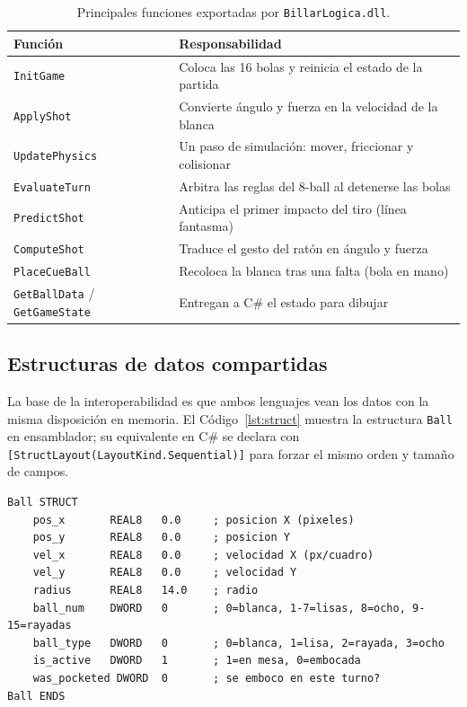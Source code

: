\documentclass[a4paper,12pt]{article}
\begin{document}
\begin{table}[H]
\centering
\caption{Principales funciones exportadas por \texttt{BillarLogica.dll}.}
\label{tab:exportadas}
\small
\renewcommand{\arraystretch}{1.25}
\begin{tabular}{
    >{\raggedright\arraybackslash}p{4.2cm}
    >{\raggedright\arraybackslash}p{9.0cm}
}
\toprule
\rowcolor{VerdeUABC}
\color{white}\textbf{Función} &
\color{white}\textbf{Responsabilidad} \\
\midrule
\rowcolor{rowLight}
\texttt{InitGame} & Coloca las 16 bolas y reinicia el estado de la partida \\
\texttt{ApplyShot} & Convierte ángulo y fuerza en la velocidad de la blanca \\
\rowcolor{rowLight}
\texttt{UpdatePhysics} & Un paso de simulación: mover, friccionar y colisionar \\
\texttt{EvaluateTurn} & Arbitra las reglas del 8-ball al detenerse las bolas \\
\rowcolor{rowLight}
\texttt{PredictShot} & Anticipa el primer impacto del tiro (línea fantasma) \\
\texttt{ComputeShot} & Traduce el gesto del ratón en ángulo y fuerza \\
\rowcolor{rowLight}
\texttt{PlaceCueBall} & Recoloca la blanca tras una falta (bola en mano) \\
\texttt{GetBallData} / \texttt{GetGameState} & Entregan a C\# el estado para dibujar \\
\bottomrule
\end{tabular}
\end{table}

\subsection{Estructuras de datos compartidas}
La base de la interoperabilidad es que ambos lenguajes vean los datos con la misma disposición en memoria. El Código~\ref{lst:struct} muestra la estructura \texttt{Ball} en ensamblador; su equivalente en C\# se declara con \texttt{[StructLayout(LayoutKind.Sequential)]} para forzar el mismo orden y tamaño de campos.

\begin{lstlisting}[style=assemblyStyle, caption={Estructura \texttt{Ball} en ensamblador (campos REAL8 y DWORD).}, label={lst:struct}]
Ball STRUCT
    pos_x       REAL8   0.0     ; posicion X (pixeles)
    pos_y       REAL8   0.0     ; posicion Y
    vel_x       REAL8   0.0     ; velocidad X (px/cuadro)
    vel_y       REAL8   0.0     ; velocidad Y
    radius      REAL8   14.0    ; radio
    ball_num    DWORD   0       ; 0=blanca, 1-7=lisas, 8=ocho, 9-15=rayadas
    ball_type   DWORD   0       ; 0=blanca, 1=lisa, 2=rayada, 3=ocho
    is_active   DWORD   1       ; 1=en mesa, 0=embocada
    was_pocketed DWORD  0       ; se emboco en este turno?
Ball ENDS
\end{lstlisting}
\end{document}
